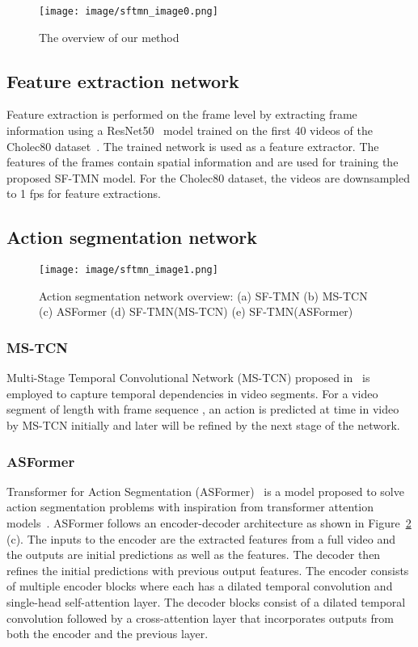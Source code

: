 \documentclass[sn-mathphys,Numbered]{sn-jnl}
\theoremstyle{thmstyleone}\newtheorem{theorem}{Theorem}\newtheorem{proposition}[theorem]{Proposition}
\theoremstyle{thmstyletwo}\newtheorem{example}{Example}\newtheorem{remark}{Remark}
\theoremstyle{thmstylethree}\newtheorem{definition}{Definition}
\begin{document}
\begin{figure}[h]\centering
\texttt{[image: image/sftmn\_image0.png]}
\caption{The overview of our method }\label{fig1}
\end{figure}

\subsection{Feature extraction network}
Feature extraction is performed on the frame level by extracting frame information using a ResNet50~\cite{he2016deep} model trained on the first 40 videos of the Cholec80 dataset~\cite{twinanda2016endonet}. The trained network is used as a feature extractor. The features of the frames contain spatial information and are used for training the proposed SF-TMN model. For the Cholec80 dataset, the videos are downsampled to 1 fps for feature extractions.

\subsection{Action segmentation network}
\begin{figure}[h]\centering
\texttt{[image: image/sftmn\_image1.png]}
\caption{Action segmentation network overview: (a) SF-TMN (b) MS-TCN (c) ASFormer (d) SF-TMN(MS-TCN) (e) SF-TMN(ASFormer)}\label{fig2}
\end{figure}
\subsubsection{MS-TCN}
Multi-Stage Temporal Convolutional Network (MS-TCN) proposed in~\cite{farha2019ms} is employed to capture temporal dependencies in video segments. For a video segment of length  with frame sequence , an action  is predicted at time  in video  by MS-TCN initially and later will be refined by the next stage of the network. 

\subsubsection{ASFormer}
Transformer for Action Segmentation (ASFormer)~\cite{yi2021asformer} is a model proposed to solve action segmentation problems with inspiration from transformer attention models~\cite{vaswani2017attention}. ASFormer follows an encoder-decoder architecture as shown in Figure~\ref{fig2} (c). The inputs to the encoder are the extracted features from a full video and the outputs are initial predictions as well as the features. The decoder then refines the initial predictions with previous output features. 
The encoder consists of multiple encoder blocks where each has a dilated temporal convolution and single-head self-attention layer. The decoder blocks consist of a dilated temporal convolution followed by a cross-attention layer that incorporates outputs from both the encoder and the previous layer. 
\end{document}
